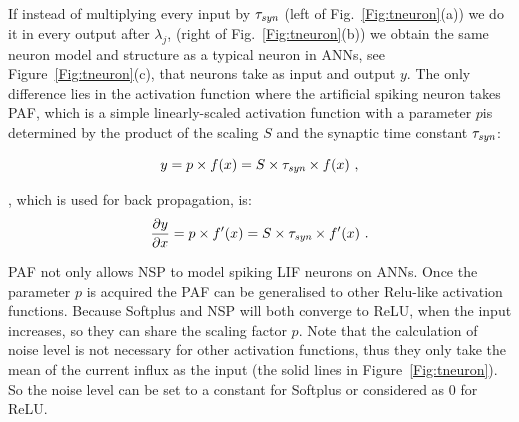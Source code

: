 	
	If instead of multiplying every input \DIFaddbegin {}\DIFaddend by $\tau_{\textit{\textrm{syn}}}$ (left of Fig.~\ref{Fig:tneuron}(a)) we do it in every output \DIFaddbegin {}\DIFaddend after $\lambda_j$, (right of Fig.~\ref{Fig:tneuron}(b)) we obtain the same neuron model and structure as a typical neuron in ANNs, see Figure~\ref{Fig:tneuron}(c), that neurons take \DIFdelbegin {}\DIFdelend \DIFaddbegin {}\DIFaddend as input and output \DIFaddbegin {}\DIFaddend $y$.
	The only difference lies in the activation function where the artificial spiking neuron takes PAF, which is a simple linearly-scaled activation function with a parameter $p$\DIFdelbegin {}\DIFdelend \DIFaddbegin {}\DIFaddend is determined by the product of the scaling \DIFdelbegin {}\DIFdelend \DIFaddbegin {}\DIFaddend $S$ and the synaptic time constant $\tau_{\textit{\textrm{syn}}}$:
	\DIFdelbegin %

\DIFdelend \begin{equation}
	y = p \times f(x) = S \times \tau_{\textit{\textrm{syn}}} \times f(x)~,
	\label{equ:PAF}
	\end{equation}
	\DIFdelbegin {}\DIFdelend \DIFaddbegin {}

	
	\DIFaddend , which is used for back propagation, is:
	\begin{equation}
	\frac{\partial y}{\partial x} = p \times f'(x) = S \times \tau_{\textit{\textrm{syn}}} \times f'(x)~.
	\end{equation}

	\DIFdelbegin {}\DIFdelend PAF not only allows NSP to model spiking LIF neurons on ANNs.
	Once the parameter $p$ is acquired the PAF can be generalised to other Relu-like activation functions.
	Because Softplus and NSP will both converge to ReLU, when the input increases, so they can share the scaling factor $p$.
	Note that the calculation of noise level is not necessary for other activation functions, thus they only take the mean of the current influx as the input (the solid lines in Figure~\ref{Fig:tneuron}).
	So the noise level can be set to a constant for Softplus or considered as 0 for ReLU.


